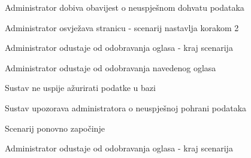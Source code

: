 \begin{packed_item}
\begin{packed_item}
\begin{packed_enum}
								\item Administrator dobiva obavijest o neuspješnom dohvatu podataka
								\item
									\begin{packed_enum}
										\item Administrator osvježava stranicu - scenarij nastavlja korakom 2
										\item Administrator odustaje od odobravanja oglasa - kraj scenarija
									\end{packed_enum}	
							\end{packed_enum}
							\item[5.a] Administrator odustaje od odobravanja navedenog oglasa
							\item[6.a] Sustav ne uspije ažurirati podatke u bazi
							\item[] \begin{packed_enum}
								\item Sustav upozorava administratora o neuspješnoj pohrani podataka 
								\item
									\begin{packed_enum}
										\item Scenarij ponovno započinje
										\item Administrator odustaje od odobravanja oglasa - kraj scenarija
									\end{packed_enum}
							\end{packed_enum}					
						\end{packed_item}
					\end{packed_item}

